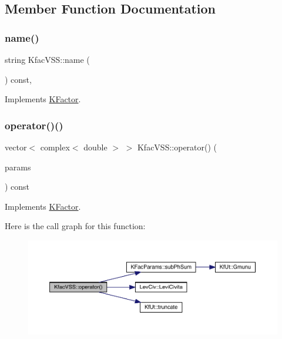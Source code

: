 \subsection{Member Function Documentation}
\mbox{\label{classKfacVSS_a12bff0a61d6252df4e362d35c907a877}} 
\subsubsection{\texorpdfstring{name()}{name()}}
{\footnotesize\ttfamily string Kfac\+V\+S\+S\+::name (\begin{DoxyParamCaption}{ }\end{DoxyParamCaption}) const\hspace{0.3cm}{\ttfamily [inline]}, {\ttfamily [virtual]}}



Implements \mbox{\hyperlink{classKFactor_ae578f8d6e4b525895427717da99cab6c}{K\+Factor}}.

\mbox{\label{classKfacVSS_a608b90a0b3fcdd1126e63c4ef68ce3e1}} 
\subsubsection{\texorpdfstring{operator()()}{operator()()}}
{\footnotesize\ttfamily vector$<$ complex$<$ double $>$ $>$ Kfac\+V\+S\+S\+::operator() (\begin{DoxyParamCaption}\item[{const \mbox{\hyperlink{classKFacParams}{K\+Fac\+Params}} \&}]{params }\end{DoxyParamCaption}) const\hspace{0.3cm}{\ttfamily [virtual]}}



Implements \mbox{\hyperlink{classKFactor_a012aae9ff4a07eab86d5d50b7f774285}{K\+Factor}}.

Here is the call graph for this function\+:\nopagebreak
\begin{figure}[H]
\begin{center}
\leavevmode
\includegraphics[width=350pt]{d9/da4/classKfacVSS_a608b90a0b3fcdd1126e63c4ef68ce3e1_cgraph}
\end{center}
\end{figure}


